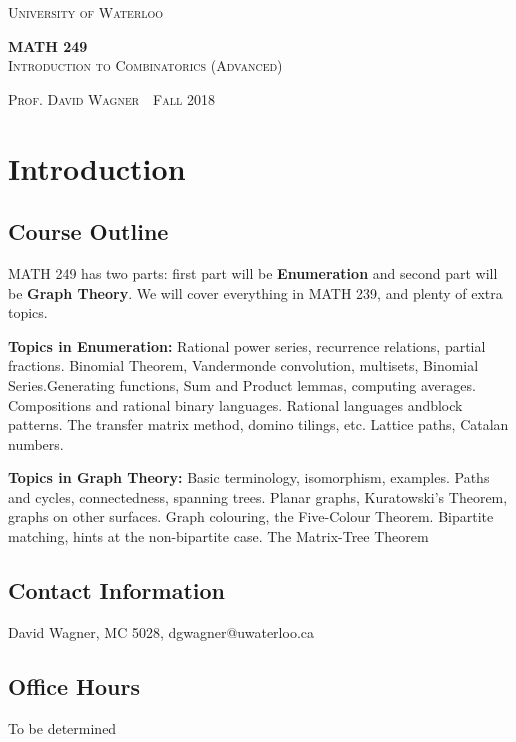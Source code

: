 \documentclass[11pt]{article}
\newcommand{\thiscoursecode}{MATH 249}
\newcommand{\thiscoursename}{Introduction to Combinatorics (Advanced)}
\newcommand{\thisprof}{David Wagner}
\newcommand{\thisterm}{Fall 2018}
\begin{document}
\begin{titlepage}
    \begin{centering}
        {\scshape\LARGE University of Waterloo \par}
        \globe
        {\huge\bf \thiscoursecode}\\
        {\scshape\Large \thiscoursename}\\
        \vspace{.3cm}
        {\scshape Prof. \thisprof~\textbullet~\thisterm\par}
    \end{centering}
\sectionline
\tableofcontents
\sectionline
\thispagestyle{empty}

\pagebreak
\section{Introduction}
\subsection{Course Outline}
MATH 249 has two parts: first part will be {\bf Enumeration} and second part
will be {\bf Graph Theory}. We will cover everything in MATH 239, and plenty of
extra
topics.

{\bf Topics in Enumeration:} Rational power series, recurrence relations,
partial fractions. Binomial Theorem, Vandermonde convolution, multisets,
Binomial Series.Generating functions, Sum and Product lemmas, computing
averages. Compositions and rational binary languages. Rational languages
andblock patterns. The transfer matrix method, domino tilings, etc. Lattice
paths, Catalan numbers.

{\bf Topics in Graph Theory:} Basic terminology, isomorphism, examples. Paths
and cycles, connectedness, spanning trees. Planar graphs, Kuratowski’s Theorem,
graphs on other surfaces. Graph colouring, the Five-Colour Theorem.
Bipartite matching, hints at the non-bipartite case. The Matrix-Tree Theorem

\subsection{Contact Information}
David Wagner, MC 5028, dgwagner@uwaterloo.ca

\subsection{Office Hours}
To be determined


\end{titlepage}
\end{document}
